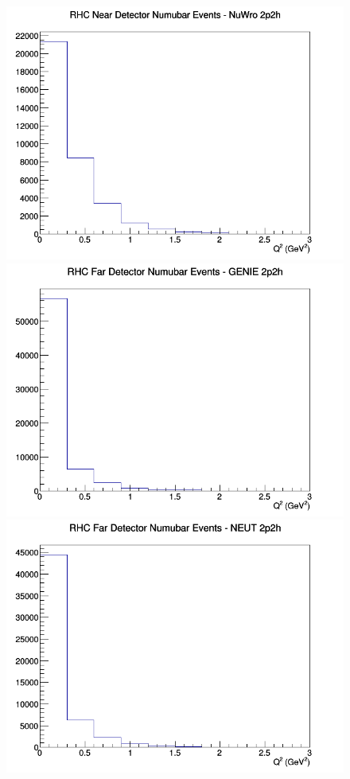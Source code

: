 \begin{figure}[h]
\includegraphics[width=\linewidth]{eff_Q2/GAr/2p2h_RHC_ND_numubar_Q2_NuWro.png}
\endminipage
\newline
{}
\includegraphics[width=\linewidth]{eff_Q2/GAr/2p2h_RHC_FD_numubar_Q2_GENIE.png}
\endminipage
{}
\includegraphics[width=\linewidth]{eff_Q2/GAr/2p2h_RHC_FD_numubar_Q2_NEUT.png}

\end{figure}
